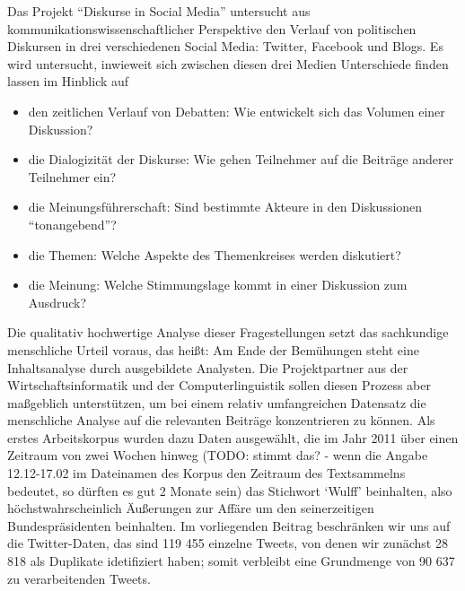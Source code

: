 \documentclass[11pt]{article}
\begin{document}
Das Projekt ``Diskurse in Social Media'' untersucht aus
kommunikationswissenschaftlicher Perspektive den Verlauf von
politischen Diskursen in drei verschiedenen Social Media: Twitter,
Facebook und Blogs. Es wird untersucht, inwieweit sich zwischen diesen
drei Medien Unterschiede finden lassen im Hinblick auf
\begin{itemize}
\item den zeitlichen Verlauf von Debatten: Wie entwickelt sich das
  Volumen einer Diskussion?
\item die Dialogizität der Diskurse: Wie gehen Teilnehmer auf die
  Beiträge anderer Teilnehmer ein?
\item die Meinungsführerschaft: Sind bestimmte Akteure in den
  Diskussionen ``tonangebend''?
\item die Themen: Welche Aspekte des Themenkreises werden diskutiert?
\item die Meinung: Welche Stimmungslage kommt in einer Diskussion zum Ausdruck?
\end{itemize}
Die qualitativ hochwertige Analyse dieser Fragestellungen setzt das
sachkundige menschliche Urteil voraus, das heißt: Am Ende der
Bemühungen steht eine Inhaltsanalyse durch ausgebildete Analysten. Die
Projektpartner aus der Wirtschaftsinformatik und der
Computerlinguistik sollen diesen Prozess aber maßgeblich unterstützen,
um bei einem relativ umfangreichen Datensatz die menschliche Analyse
auf die relevanten Beiträge konzentrieren zu können. Als erstes
Arbeitskorpus wurden dazu Daten ausgewählt, die im Jahr 2011 über
einen Zeitraum von zwei Wochen hinweg (TODO: stimmt das? - wenn die
Angabe 12.12-17.02 im Dateinamen des Korpus den Zeitraum des
Textsammelns bedeutet, so d\"urften es gut 2 Monate sein) das
Stichwort `Wulff' beinhalten, also höchstwahrscheinlich Äußerungen zur
Affäre um den seinerzeitigen Bundespräsidenten beinhalten. Im
vorliegenden Beitrag beschränken wir uns auf die Twitter-Daten, das
sind 119 455 einzelne Tweets, von denen wir zunächst 28 818 als
Duplikate idetifiziert haben; somit verbleibt eine Grundmenge von 90
637 zu verarbeitenden Tweets.
\end{document}
